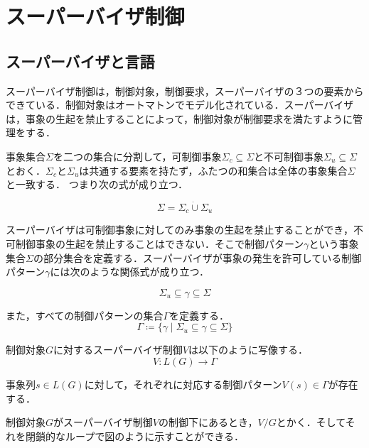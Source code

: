 \documentclass[dvipdfmx]{newthesis}
\begin{document}
\section{スーパーバイザ制御}
\subsection{スーパーバイザと言語}

スーパーバイザ制御は，制御対象，制御要求，スーパーバイザの３つの要素からできている．制御対象はオートマトンでモデル化されている．スーパーバイザは，事象の生起を禁止することによって，制御対象が制御要求を満たすように管理をする．

事象集合$\Sigma$を二つの集合に分割して，可制御事象$\Sigma_c \subseteq \Sigma$と不可制御事象$\Sigma_u \subseteq \Sigma$とおく．$\Sigma_c$と$\Sigma_u$は共通する要素を持たず，ふたつの和集合は全体の事象集合$\Sigma$と一致する． つまり次の式が成り立つ．

\begin{equation}
    \Sigma = \Sigma_c \dot{\cup} \Sigma_u
\end{equation}

スーパーバイザは可制御事象に対してのみ事象の生起を禁止することができ，不可制御事象の生起を禁止することはできない．そこで制御パターン$\gamma$という事象集合$\Sigma$の部分集合を定義する．スーパーバイザが事象の発生を許可している制御パターン$\gamma$には次のような関係式が成り立つ．

\begin{equation}
    \Sigma_u \subseteq \gamma \subseteq \Sigma
\end{equation}

また，すべての制御パターンの集合$\Gamma$を定義する．
\begin{equation}
    \Gamma \coloneqq \{\gamma \mid \Sigma_u \subseteq \gamma \subseteq \Sigma\}
\end{equation}

制御対象$G$に対するスーパーバイザ制御$V$は以下のように写像する．
\begin{equation}
    V \colon L(G) \rightarrow \Gamma
\end{equation}

事象列$s \in L(G)$に対して，それぞれに対応する制御パターン$V(s) \in \Gamma$が存在する．

制御対象$G$がスーパーバイザ制御$V$の制御下にあるとき，$V/G$とかく．そしてそれを閉鎖的なループで図のように示すことができる．
\end{document}
